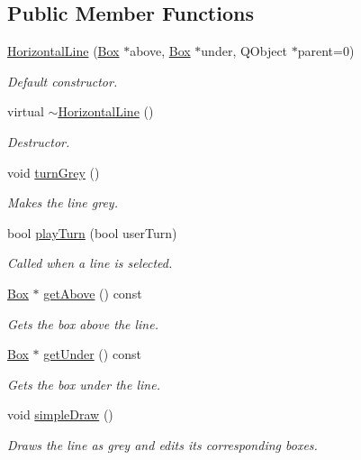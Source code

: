 \subsection*{\-Public \-Member \-Functions}
\begin{DoxyCompactItemize}
\item 
\hyperlink{classHorizontalLine_ad74caf3817002a674c7e8e813bb3fb73}{\-Horizontal\-Line} (\hyperlink{classBox}{\-Box} $\ast$above, \hyperlink{classBox}{\-Box} $\ast$under, \-Q\-Object $\ast$parent=0)
\begin{DoxyCompactList}\small\item\em \-Default constructor. \end{DoxyCompactList}\item 
virtual \hyperlink{classHorizontalLine_a466f8a4e47a315d901cef8b3b1856366}{$\sim$\-Horizontal\-Line} ()
\begin{DoxyCompactList}\small\item\em \-Destructor. \end{DoxyCompactList}\item 
void \hyperlink{classHorizontalLine_ae4b1b9f4b9de1e4393868675813fbf8c}{turn\-Grey} ()
\begin{DoxyCompactList}\small\item\em \-Makes the line grey. \end{DoxyCompactList}\item 
bool \hyperlink{classHorizontalLine_aefd796758e374952b730268387f134e6}{play\-Turn} (bool user\-Turn)
\begin{DoxyCompactList}\small\item\em \-Called when a line is selected. \end{DoxyCompactList}\item 
\hyperlink{classBox}{\-Box} $\ast$ \hyperlink{classHorizontalLine_ad2289edae1e1ce26630d0215578ae5b6}{get\-Above} () const 
\begin{DoxyCompactList}\small\item\em \-Gets the box above the line. \end{DoxyCompactList}\item 
\hyperlink{classBox}{\-Box} $\ast$ \hyperlink{classHorizontalLine_aafd04b01e9a589e429b3bfd500c1ff2e}{get\-Under} () const 
\begin{DoxyCompactList}\small\item\em \-Gets the box under the line. \end{DoxyCompactList}\item 
\hypertarget{classHorizontalLine_a58f734584ae2417115b989c044ff2694}{void \hyperlink{classHorizontalLine_a58f734584ae2417115b989c044ff2694}{simple\-Draw} ()}\label{classHorizontalLine_a58f734584ae2417115b989c044ff2694}

\begin{DoxyCompactList}\small\item\em \-Draws the line as grey and edits its corresponding boxes. \end{DoxyCompactList}\end{DoxyCompactItemize}


